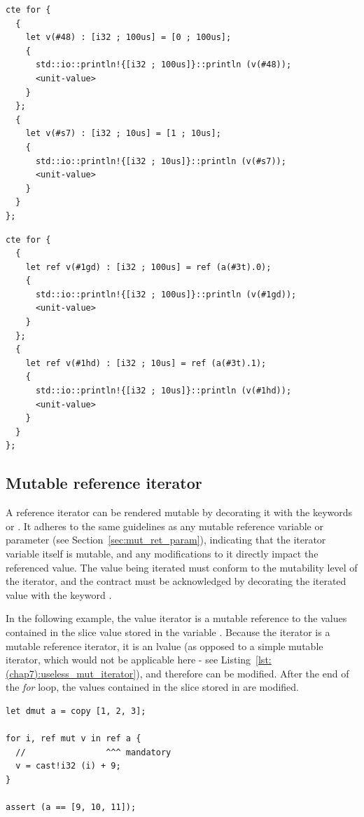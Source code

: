 \begin{lstlisting}[style=myilVerb, caption=By copy iteration on a tuple, label=lst:(chap7):copy_value_iter_tu]
cte for {
  {
    let v(#48) : [i32 ; 100us] = [0 ; 100us];
    {
      std::io::println!{[i32 ; 100us]}::println (v(#48));
      <unit-value>
    }
  };
  {
    let v(#s7) : [i32 ; 10us] = [1 ; 10us];
    {
      std::io::println!{[i32 ; 10us]}::println (v(#s7));
      <unit-value>
    }
  }
};
\end{lstlisting}

\begin{lstlisting}[style=myilVerb, caption=By reference iteration on a tuple, label=lst:(chap7):ref_value_iter_tu]
cte for {
  {
    let ref v(#1gd) : [i32 ; 100us] = ref (a(#3t).0);
    {
      std::io::println!{[i32 ; 100us]}::println (v(#1gd));
      <unit-value>
    }
  };
  {
    let ref v(#1hd) : [i32 ; 10us] = ref (a(#3t).1);
    {
      std::io::println!{[i32 ; 10us]}::println (v(#1hd));
      <unit-value>
    }
  }
};
\end{lstlisting}

\subsection{Mutable reference iterator}

A reference iterator can be rendered mutable by decorating it with the keywords
 or . It adheres to the same guidelines as any mutable
reference variable or parameter (see Section~\ref{sec:mut_ret_param}),
indicating that the iterator variable itself is mutable, and any modifications
to it directly impact the referenced value. The value being iterated must
conform to the mutability level of the iterator, and the contract must be
acknowledged by decorating the iterated value with the keyword .

In the following example, the value iterator is a mutable reference to the
values contained in the slice value stored in the variable . Because
the iterator is a mutable reference iterator, it is an lvalue (as opposed to a
simple mutable iterator, which would not be applicable here - see
Listing~\ref{lst:(chap7):useless_mut_iterator}), and therefore can be modified. After
the end of the \textit{for} loop, the values contained in the slice stored in
 are modified.

\begin{lstlisting}[style=coloredverbatim, escapechar=@]
let dmut a = copy [1, 2, 3];

for i, ref mut v in ref a {
  //                ^^^ mandatory
  v = cast!i32 (i) + 9;
}

assert (a == [9, 10, 11]);
\end{lstlisting}

